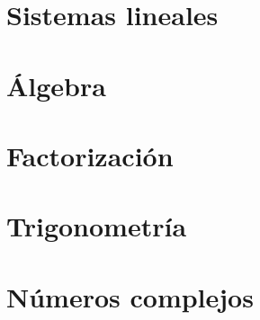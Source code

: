 \documentclass[
]{tufte-book}
\begin{document}
\chapter{Sistemas lineales}





\chapter{Álgebra}








\chapter{Factorización}







\chapter{Trigonometría}



\chapter{Números complejos}


%
{}

\end{document}
